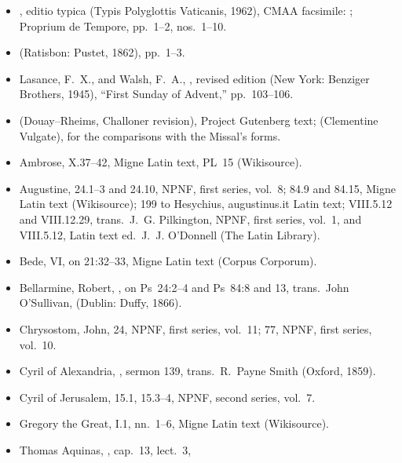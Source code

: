 {\footnotesize
\begin{itemize}[leftmargin=1.2em,itemsep=.15em]
\item {}, editio typica (Typis
Polyglottis Vaticanis, 1962), CMAA facsimile: ;
Proprium de Tempore, pp.~1--2, nos.~1--10.
\item {} (Ratisbon: Pustet, 1862), pp.~1--3.
\item Lasance, F.~X., and Walsh, F.~A., , revised edition (New York: Benziger Brothers, 1945), ``First Sunday
of Advent,'' pp.~103--106.
\item {} (Douay--Rheims,
Challoner revision), Project Gutenberg text;  (Clementine Vulgate), for the comparisons with the Missal's forms.
\item Ambrose,  X.37--42, Migne
Latin text, PL~15 (Wikisource).
\item Augustine,  24.1--3 and 24.10, NPNF,
first series, vol.~8; 84.9 and 84.15, Migne Latin text (Wikisource);
 199 to Hesychius, augustinus.it Latin text;
 VIII.5.12 and VIII.12.29, trans.\ J.~G. Pilkington, NPNF,
first series, vol.~1, and VIII.5.12, Latin text ed.\ J.~J. O'Donnell (The
Latin Library).
\item Bede,  VI, on 21:32--33, Migne Latin
text (Corpus Corporum).
\item Bellarmine, Robert, , on Ps~24:2--4 and
Ps~84:8 and 13, trans.\ John O'Sullivan,  (Dublin: Duffy, 1866).
\item Chrysostom, John,  24, NPNF, first series,
vol.~11;  77, NPNF, first series, vol.~10.
\item Cyril of Alexandria, ,
sermon 139, trans.\ R.~Payne Smith (Oxford, 1859).
\item Cyril of Jerusalem,  15.1, 15.3--4, NPNF,
second series, vol.~7.
\item Gregory the Great,  I.1, nn.~1--6, Migne
Latin text (Wikisource).
\item Thomas Aquinas, , cap.~13, lect.~3,

\end{itemize}}
